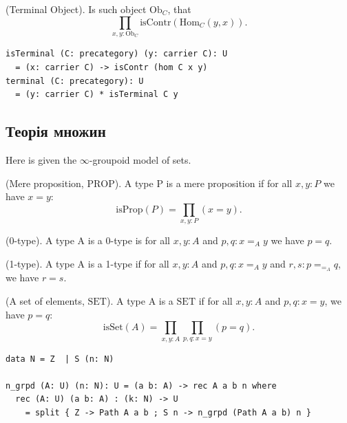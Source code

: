 \begin{definition}
\begin{definition} (Terminal Object). Is such object $\mathrm{Ob}_C$,
that
$$
    \prod_{x,y:\mathrm{Ob}_C} \mathrm{isContr} (\mathrm{Hom}_C(y,x)).
$$
\begin{lstlisting}
isTerminal (C: precategory) (y: carrier C): U
  = (x: carrier C) -> isContr (hom C x y)
terminal (C: precategory): U
  = (y: carrier C) * isTerminal C y
\end{lstlisting}
\end{definition}


\subsection*{Теорія множин}

Here is given the $\infty$-groupoid model of sets.

\begin{definition} (Mere proposition, $\mathrm{PROP}$).
A type P is a mere proposition if for all $x,y: P$ we have $x=y$:
$$
    \mathrm{isProp}(P) = \prod_{x,y:P}(x=y).
$$
\end{definition}

\begin{definition} (0-type).
A type A is a 0-type is for all $x,y: A$ and $p,q: x =_A y$ we have $p = q$.
\end{definition}

\begin{definition} (1-type).
A type A is a 1-type if for all $x,y: A$ and $p,q: x =_A y$ and $r,s:p =_{=_A} q$, we have $r = s$.
\end{definition}

\begin{definition} (A set of elements, $\mathrm{SET}$).
A type A is a $\mathrm{SET}$ if for all $x,y: A$ and $p,q: x = y$, we have $p = q$:
$$
    \mathrm{isSet}(A) = \prod_{x,y:A}\prod_{p,q:x=y}(p=q).
$$
\end{definition}

\begin{definition}
\begin{lstlisting}
data N = Z  | S (n: N)

n_grpd (A: U) (n: N): U = (a b: A) -> rec A a b n where
  rec (A: U) (a b: A) : (k: N) -> U
    = split { Z -> Path A a b ; S n -> n_grpd (Path A a b) n }


\end{lstlisting}
\end{definition}
\end{definition}

